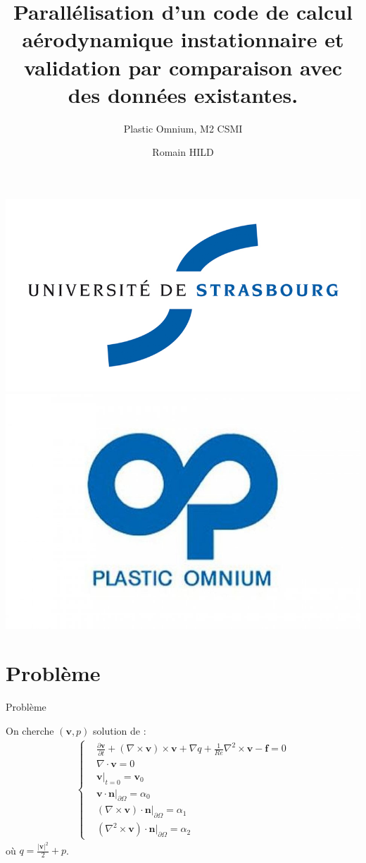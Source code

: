 \documentclass{beamer}
\title[Stage]{Parallélisation d'un code de calcul aérodynamique instationnaire et validation par comparaison avec des données existantes.}
\subtitle{Plastic Omnium, M2 CSMI}
\author{Romain HILD}
\institute{Université de Strasbourg}
\newcommand{\grad}{{\nabla}}
\newcommand{\rot}{{\nabla\times}}
\newcommand{\rott}{{\nabla^2\times}}
\renewcommand{\div}{{\nabla\cdot}}
\newcommand{\restr}{{\big\rvert_{\partial\Omega}}}
\begin{document}
\begin{frame}
\includegraphics[scale=0.2]{uds.jpg}\includegraphics[scale=0.15]{po.jpg}
\titlepage
\end{frame}

\section{Problème}
\begin{frame}{Problème}
\begin{block}{On cherche $(\mathbf{v},p)$ solution de :}
\begin{eqnarray}
\label{depart}
\left\{\begin{aligned}
&\frac{\partial \mathbf{v}}{\partial t} + (\rot  \mathbf{v})\times \mathbf{v} + \grad q + \frac{1}{Re}\rott  \mathbf{v}-\mathbf{f} = 0\\
&\div \mathbf{v} = 0\\
&\mathbf{v}\big\rvert_{t=0} = \mathbf{v}_0\\
&\mathbf{v}\cdot \mathbf{n}\restr = \alpha_0\\
&(\rot  \mathbf{v})\cdot \mathbf{n}\restr = \alpha_1\\
&(\rott  \mathbf{v})\cdot \mathbf{n}\restr = \alpha_2
\end{aligned}\right.
\end{eqnarray}
où $q = \frac{|\mathbf{v}|^2}{2}+p$.
\end{block}
\end{frame}
\end{document}

